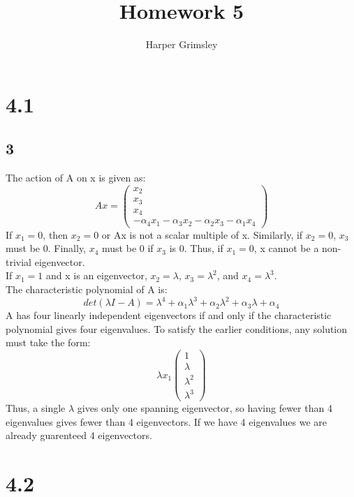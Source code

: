 \documentclass{article}
\title{Homework 5}
\author{Harper Grimsley}
\begin{document}
\maketitle
\section*{4.1}
\subsection*{3}
The action of A on x is given as:
$$Ax = \begin{pmatrix}x_2\\x_3\\x_4\\-\alpha_4x_1-\alpha_3x_2-\alpha_2x_3-\alpha_1x_4\end{pmatrix}$$
If $x_1 = 0$, then $x_2 = 0$ or Ax is not a scalar multiple of x.  Similarly, if $x_2 = 0$, $x_3$ must be 0. Finally, $x_4$ must be 0 if $x_3$ is 0.  Thus, if $x_1 = 0$, x cannot be a non-trivial eigenvector.   
\\
If $x_1 =1$ and x is an eigenvector, $x_2 = \lambda$, $x_3 = \lambda^2$, and $x_4 = \lambda^3$.\\
The characteristic polynomial of A is:  
$$det(\lambda I-A) = \lambda^4 + \alpha_1\lambda^3+\alpha_2\lambda^2+\alpha_3\lambda+\alpha_4$$
A has four linearly independent eigenvectors if and only if the characteristic polynomial gives four eigenvalues.  To satisfy the earlier conditions, any solution must take the form:
$$\lambda x_1 \begin{pmatrix}1\\\lambda\\\lambda^2\\\lambda^3\end{pmatrix}$$ 
Thus, a single $\lambda$ gives only one spanning eigenvector, so having fewer than 4 eigenvalues gives fewer than 4 eigenvectors.  If we have 4 eigenvalues we are already guarenteed 4 eigenvectors.
\section*{4.2}
\end{document}

